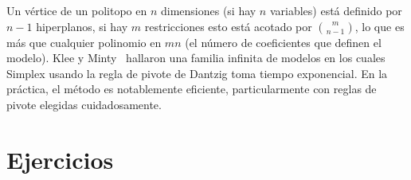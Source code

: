   Un vértice de un politopo en \(n\) dimensiones
  (si hay \(n\) variables)
  está definido por \(n - 1\) hiperplanos,
  si hay \(m\) restricciones esto está acotado por \(\binom{m}{n - 1}\),
  lo que es más que cualquier polinomio en \(m n\)
  (el número de coeficientes que definen el modelo).
  Klee y Minty~%
    \cite{klee69:_how_good_simplex_algo}
  hallaron una familia infinita de modelos en los cuales Simplex
  usando la regla de pivote de Dantzig toma tiempo exponencial.
  En la práctica,
  el método es notablemente eficiente,
  particularmente con reglas de pivote elegidas cuidadosamente.

\section*{Ejercicios}
\label{sec:ex-17a}

